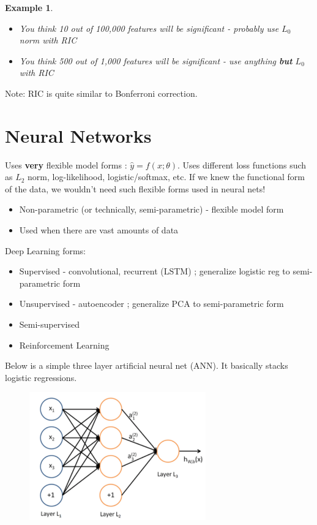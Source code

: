 \documentclass[a4paper]{article}\usepackage[]{graphicx}\usepackage[]{color}
\newtheorem{ex}{Example}[section]
\begin{document}
\begin{ex}
\begin{itemize}
\item You think 10 out of 100,000 features will be significant - probably use $L_0$ norm with RIC
\item You think 500 out of 1,000 features will be significant - use anything \textbf{but} $L_0$ with RIC
\end{itemize}
\end{ex}

Note: RIC is quite similar to Bonferroni correction. 

\section{Neural Networks}

Uses \textbf{very} flexible model forms : $\hat{y}=f(x;\theta)$. Uses different loss functions such as $L_2$ norm, log-likelihood, logistic/softmax, etc. If we knew the functional form of the data, we wouldn't need such flexible forms used in neural nets!

\begin{itemize}
\item Non-parametric (or technically, semi-parametric) - flexible model form
\item Used when there are vast amounts of data
\end{itemize}

Deep Learning forms:
\begin{itemize}
\item Supervised - convolutional, recurrent  (LSTM) ; generalize logistic reg to semi-parametric form
\item Unsupervised - autoencoder ; generalize PCA to semi-parametric form
\item Semi-supervised
\item Reinforcement Learning
\end{itemize}

Below is a simple three layer artificial neural net (ANN). It basically stacks logistic regressions. 
\begin{figure}[H]
\centering
\includegraphics[width=3in]{nn_simp.png}
\end{figure}
\end{document}
